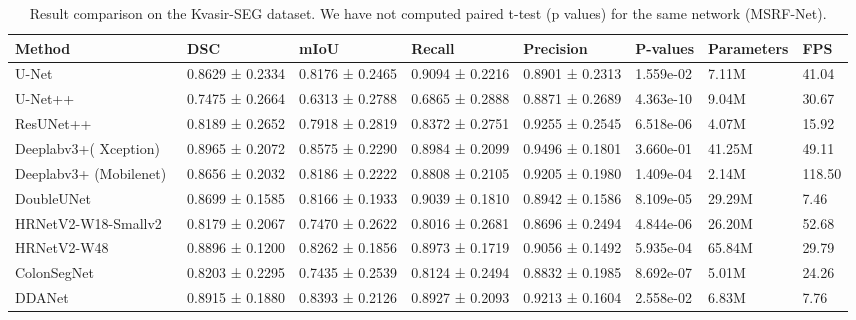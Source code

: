 \documentclass[journal,twoside,web]{IEEEtran}
\begin{document}
\begin{table*}[!t]
\centering
\footnotesize
\caption{Result comparison on the Kvasir-SEG dataset. We have not computed paired t-test (p values) for the same network (MSRF-Net).}
\begin{tabular}{@{}l|l|l|l|l|l|l|l@{}}
\toprule
\textbf{Method} & \textbf{DSC} & \textbf{mIoU} & \textbf{Recall} & \textbf{Precision} & \textbf{P-values} & \textbf{Parameters} & \textbf{FPS}\\ 
\hline
\hline
U-Net~\cite{ronneberger2015u} & 0.8629 ± 0.2334 & 0.8176 ± 0.2465 & 0.9094 ± 0.2216 &0.8901 ± 0.2313 & 1.559e-02  & 7.11M & 41.04  \\ \hline
U-Net++~\cite{zhou2019unet++} & 0.7475 ± 0.2664 & 0.6313 ± 0.2788 & 0.6865 ± 0.2888 & 0.8871 ± 0.2689 & 4.363e-10 & 9.04M & 30.67 \\ \hline
ResUNet++~\cite{jha2019resunet++} & 0.8189 ± 0.2652 & 0.7918 ± 0.2819 & 0.8372 ± 0.2751 & 0.9255 ± 0.2545 & 6.518e-06 & 4.07M & 15.92\\ \hline


Deeplabv3+( Xception)~\cite{chen2018encoder} & 0.8965 ± 0.2072 & 0.8575 ± 0.2290  & 0.8984 ± 0.2099  & 0.9496 ± 0.1801 & 3.660e-01 & 41.25M & 49.11 \\ \hline

Deeplabv3+ (Mobilenet)~\cite{chen2018encoder} & 0.8656 ± 0.2032 & 0.8186 ± 0.2222 & 0.8808 ± 0.2105 & 0.9205 ± 0.1980 & 1.409e-04 & 2.14M & 118.50\\ \hline


{DoubleUNet}~\cite{jha2020doubleu} &0.8699 ± 0.1585 & {0.8166} ± {0.1933} &{0.9039} ± 0.1810 & 0.8942 ± 0.1586 & 8.109e-05 & 29.29M & 7.46 \\ \hline

HRNetV2-W18-Smallv2~\cite{Wang_2020} & 0.8179 ± 0.2067 & 0.7470 ± 0.2622  & 0.8016 ± 0.2681 & 0.8696 ± 0.2494 & 4.844e-06 & 26.20M & 52.68 \\ \hline

HRNetV2-W48~\cite{Wang_2020} & 0.8896 ± 0.1200 & 0.8262 ± 0.1856 & 0.8973 ± 0.1719 & 0.9056 ± 0.1492 & 5.935e-04 & 65.84M & 29.79 \\ \hline


ColonSegNet~\cite{jha2021real} & 0.8203 ± 0.2295 & 0.7435 ± 0.2539 & 0.8124 ± 0.2494  & 0.8832 ± 0.1985 & 8.692e-07 & 5.01M & 24.26 \\ \hline

DDANet~\cite{tomar2020ddanet}& 0.8915 ± 0.1880 & 0.8393 ± 0.2126 & 0.8927 ± 0.2093 & 0.9213 ± 0.1604 & 2.558e-02 & 6.83M & 7.76\\ \hline


\end{tabular}
\end{table*}
\end{document}
